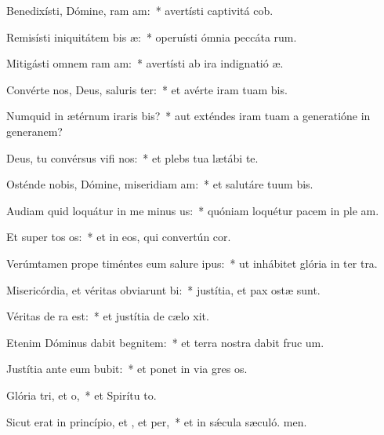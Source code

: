 \item Benedixísti, Dómine, ram am:~* avertísti captivitá cob.
\item Remisísti iniquitátem bis æ:~* operuísti ómnia peccáta rum.
\item Mitigásti omnem ram am:~* avertísti ab ira indignatió æ.
\item Convérte nos, Deus, saluris ter:~* et avérte iram tuam  bis.
\item Numquid in ætérnum iraris bis?~* aut exténdes iram tuam a generatióne in generanem?
\item Deus, tu convérsus vifi nos:~* et plebs tua lætábi  te.
\item Osténde nobis, Dómine, miseridiam am:~* et salutáre tuum  bis.
\item Audiam quid loquátur in me minus us:~* quóniam loquétur pacem in ple am.
\item Et super tos os:~* et in eos, qui convertún  cor.
\item Verúmtamen prope timéntes eum salure ipus:~* ut inhábitet glória in ter tra.
\item Misericórdia, et véritas obviarunt bi:~* justítia, et pax ostæ sunt.
\item Véritas de ra  est:~* et justítia de cælo xit.
\item Etenim Dóminus dabit begnitem:~* et terra nostra dabit fruc um.
\item Justítia ante eum bubit:~* et ponet in via gres os.
\item Glória tri, et o,~* et Spirítu to.
\item Sicut erat in princípio, et , et per,~* et in sǽcula sæculó. men.
